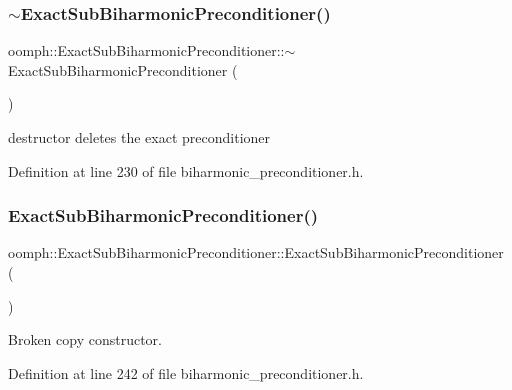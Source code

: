 \subsubsection{\texorpdfstring{$\sim$\+Exact\+Sub\+Biharmonic\+Preconditioner()}{~ExactSubBiharmonicPreconditioner()}}
{\footnotesize\ttfamily oomph\+::\+Exact\+Sub\+Biharmonic\+Preconditioner\+::$\sim$\+Exact\+Sub\+Biharmonic\+Preconditioner (\begin{DoxyParamCaption}{ }\end{DoxyParamCaption})\hspace{0.3cm}{\ttfamily [inline]}}



destructor deletes the exact preconditioner 



Definition at line 230 of file biharmonic\+\_\+preconditioner.\+h.

\mbox{\label{classoomph_1_1ExactSubBiharmonicPreconditioner_a5db2f5766547c7b931252ffbe0192dad}} 
\subsubsection{\texorpdfstring{Exact\+Sub\+Biharmonic\+Preconditioner()}{ExactSubBiharmonicPreconditioner()}\hspace{0.1cm}{\footnotesize\ttfamily [2/2]}}
{\footnotesize\ttfamily oomph\+::\+Exact\+Sub\+Biharmonic\+Preconditioner\+::\+Exact\+Sub\+Biharmonic\+Preconditioner (\begin{DoxyParamCaption}\item[{const \hyperlink{classoomph_1_1ExactSubBiharmonicPreconditioner}{Exact\+Sub\+Biharmonic\+Preconditioner} \&}]{ }\end{DoxyParamCaption})\hspace{0.3cm}{\ttfamily [inline]}}



Broken copy constructor. 



Definition at line 242 of file biharmonic\+\_\+preconditioner.\+h.



